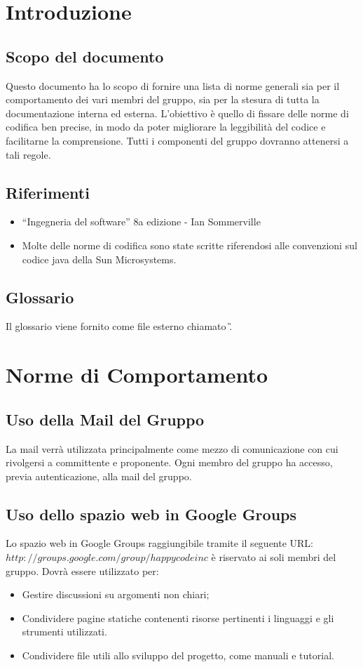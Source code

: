 \newpage
\tableofcontents 

\chapter{Introduzione}
\section{Scopo del documento}
Questo documento ha lo scopo di fornire una lista di norme generali sia per il comportamento dei vari membri del gruppo, sia per la stesura di tutta la documentazione interna ed esterna. L'obiettivo \`e quello di fissare delle norme di codifica ben precise, in modo da poter migliorare la leggibilit\`a del codice e facilitarne la comprensione. Tutti i componenti del gruppo dovranno attenersi a tali regole.
\section{Riferimenti}
\begin{itemize}
\item ``Ingegneria del software'' 8a edizione - Ian Sommerville 
\item Molte delle norme di codifica sono state scritte riferendosi alle convenzioni sul codice java della Sun Microsystems.
\end{itemize}
\section{Glossario}
Il glossario viene fornito come file esterno chiamato \G.

\chapter{Norme di Comportamento}
\section{Uso della Mail del Gruppo}
La mail verr\`a utilizzata principalmente come mezzo di comunicazione con cui rivolgersi a committente e proponente. Ogni membro del gruppo ha accesso, previa autenticazione, alla mail del gruppo.
\section{Uso dello spazio web in Google Groups}
Lo spazio web in Google Groups raggiungibile tramite il seguente URL: \({http://groups.google.com/group/happycodeinc}\) \`e riservato ai soli membri del gruppo. Dovr\`a essere utilizzato per:
\begin{itemize}
\item  Gestire discussioni su argomenti non chiari;
\item Condividere pagine statiche contenenti risorse pertinenti i linguaggi e gli strumenti utilizzati.
\item Condividere file utili allo sviluppo del progetto, come manuali e tutorial.
\end{itemize}
